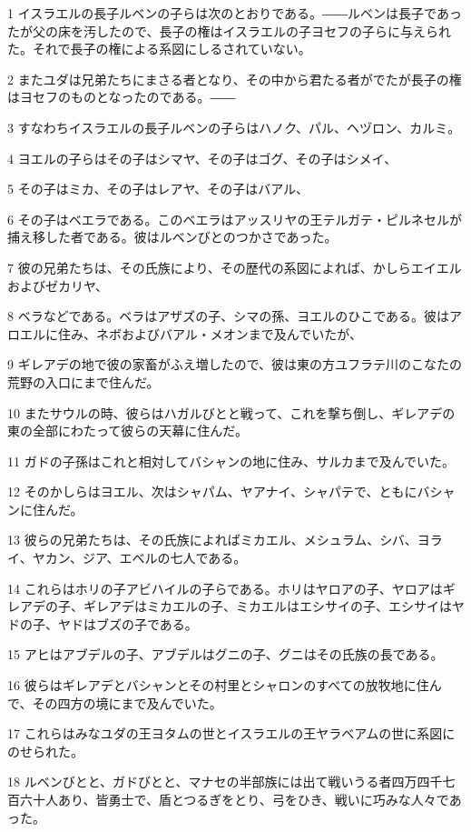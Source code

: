 \par 1 イスラエルの長子ルベンの子らは次のとおりである。――ルベンは長子であったが父の床を汚したので、長子の権はイスラエルの子ヨセフの子らに与えられた。それで長子の権による系図にしるされていない。
\par 2 またユダは兄弟たちにまさる者となり、その中から君たる者がでたが長子の権はヨセフのものとなったのである。――
\par 3 すなわちイスラエルの長子ルベンの子らはハノク、パル、ヘヅロン、カルミ。
\par 4 ヨエルの子らはその子はシマヤ、その子はゴグ、その子はシメイ、
\par 5 その子はミカ、その子はレアヤ、その子はバアル、
\par 6 その子はベエラである。このベエラはアッスリヤの王テルガテ・ピルネセルが捕え移した者である。彼はルベンびとのつかさであった。
\par 7 彼の兄弟たちは、その氏族により、その歴代の系図によれば、かしらエイエルおよびゼカリヤ、
\par 8 ベラなどである。ベラはアザズの子、シマの孫、ヨエルのひこである。彼はアロエルに住み、ネボおよびバアル・メオンまで及んでいたが、
\par 9 ギレアデの地で彼の家畜がふえ増したので、彼は東の方ユフラテ川のこなたの荒野の入口にまで住んだ。
\par 10 またサウルの時、彼らはハガルびとと戦って、これを撃ち倒し、ギレアデの東の全部にわたって彼らの天幕に住んだ。
\par 11 ガドの子孫はこれと相対してバシャンの地に住み、サルカまで及んでいた。
\par 12 そのかしらはヨエル、次はシャパム、ヤアナイ、シャパテで、ともにバシャンに住んだ。
\par 13 彼らの兄弟たちは、その氏族によればミカエル、メシュラム、シバ、ヨライ、ヤカン、ジア、エベルの七人である。
\par 14 これらはホリの子アビハイルの子らである。ホリはヤロアの子、ヤロアはギレアデの子、ギレアデはミカエルの子、ミカエルはエシサイの子、エシサイはヤドの子、ヤドはブズの子である。
\par 15 アヒはアブデルの子、アブデルはグニの子、グニはその氏族の長である。
\par 16 彼らはギレアデとバシャンとその村里とシャロンのすべての放牧地に住んで、その四方の境にまで及んでいた。
\par 17 これらはみなユダの王ヨタムの世とイスラエルの王ヤラベアムの世に系図にのせられた。
\par 18 ルベンびとと、ガドびとと、マナセの半部族には出て戦いうる者四万四千七百六十人あり、皆勇士で、盾とつるぎをとり、弓をひき、戦いに巧みな人々であった。

